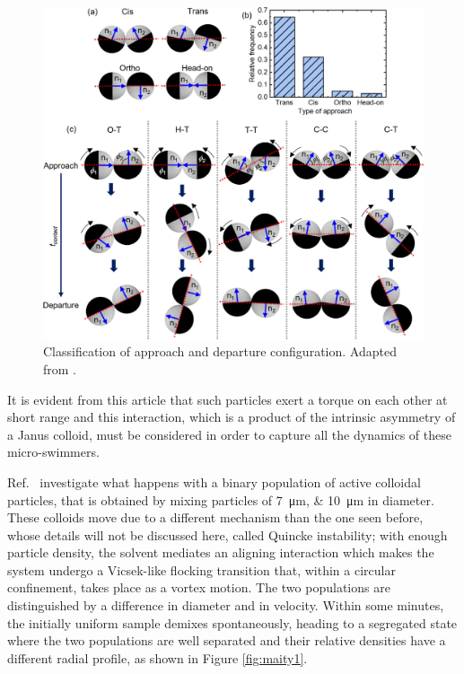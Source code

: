 \documentclass[../../master_thesis_np.tex]{subfiles}
\begin{document}
	\begin{figure}[htp]
		\centering
		\includegraphics[width=\singfigwidth]{singh_pair1.jpeg}
		\caption{Classification of approach and departure configuration. Adapted from \cite{singh_pair_2024}.}
		\label{fig:singh_pair1}
	\end{figure}
	
	It is evident from this article that such particles exert a torque on each other at short range and this interaction, which is a product of the intrinsic asymmetry of a Janus colloid, must be considered in order to capture all the dynamics of these micro-swimmers.
	
	Ref.\ \cite{maity_spontaneous_2023} investigate what happens with a binary population of active colloidal particles, that is obtained by mixing particles of \qtylist{7;10}{\um} in diameter. 
	These colloids move due to a different mechanism than the one seen before, whose details will not be discussed here, called Quincke instability; with enough particle density, the solvent mediates an aligning interaction which makes the system undergo a Vicsek-like flocking transition that, within a circular confinement, takes place as a vortex motion. 
	The two populations are distinguished by a difference in diameter and in velocity. 
	Within some minutes, the initially uniform sample demixes spontaneously, heading to a segregated state where the two populations are well separated and their relative densities have a different radial profile, as shown in Figure \ref{fig:maity1}.
	
\end{document}
